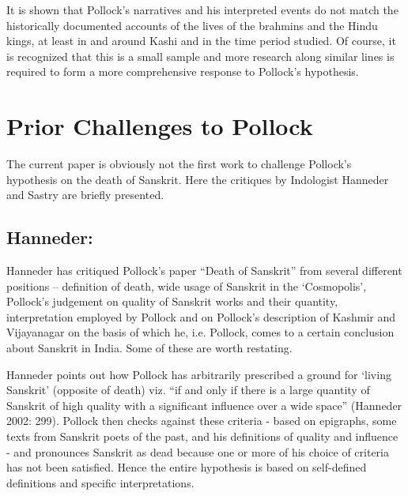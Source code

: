 It is shown that Pollock’s narratives and his interpreted events do not match the historically documented accounts of the lives of the brahmins and the Hindu kings, at least in and around Kashi and in the time period studied. Of course, it is recognized that this is a small sample and more research along similar lines is required to form a more comprehensive response to Pollock’s hypothesis.

\newpage

\section*{Prior Challenges to Pollock}

The current paper is obviously not the first work to challenge Pollock’s hypothesis on the death of Sanskrit. Here the critiques by Indologist Hanneder and Sastry are briefly presented.

\subsection*{Hanneder:}

Hanneder has critiqued Pollock’s paper “Death of Sanskrit” from several different positions – definition of death, wide usage of Sanskrit in the ‘Cosmopolis’, Pollock’s judgement on quality of Sanskrit works and their quantity, interpretation employed by Pollock and on Pollock’s description of Kashmir and Vijayanagar on the basis of which he, i.e. Pollock, comes to a certain conclusion about Sanskrit in India. Some of these are worth restating.

Hanneder points out how Pollock has arbitrarily prescribed a ground for ‘living Sanskrit’ (opposite of death) viz. “if and only if there is a large quantity of Sanskrit of high quality with a significant influence over a wide space” (Hanneder 2002: 299). Pollock then checks against these criteria - based on epigraphs, some texts from Sanskrit poets of the past, and his definitions of quality and influence - and pronounces Sanskrit as dead because one or more of his choice of criteria has not been satisfied. Hence the entire hypothesis is based on self-defined definitions and specific interpretations.

